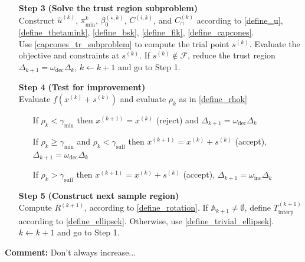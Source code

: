 \documentclass{article}
\newenvironment{comment}
  {\par\medskip
   \color{red}%
   \begin{framed}
   \textbf{Comment: }\ignorespaces}
 {\end{framed}
  \medskip}
\theoremstyle{case}
\numberwithin{theorem}{subsection}
\newcommand{\activeconstraintskpo}{{\mathbb A_{k+1}}}
\newcommand{\bsk}{{\beta_0^{(\star, k)}}}
\newcommand{\capcones}{{C^{(k)}_{\cap}}}
\newcommand{\dk}{\Delta_k}
\newcommand{\dkpo}{\Delta_{k+1}}
\newcommand{\feasible}{{\mathcal F}}
\newcommand{\gammabi}{\gamma_{\textrm{suff}}}
\newcommand{\gammasm}{\gamma_{\textrm{min}}}
\newcommand{\huk}{{{\hat u}^{(k)}}}
\newcommand{\mfk}{{{m}_f}^{(k)}}
\newcommand{\omegadec}{\omega_{\text{dec}}}
\newcommand{\omegainc}{\omega_{\text{inc}}}
\newcommand{\rk}{\rho_k}
\newcommand{\rotk}{{R^{(k+1)}}}
\newcommand{\sampletrkpo}{{T_{\text{interp}}^{(k+1)}}}
\newcommand{\sk}{{{s}^{(k)}}}
\newcommand{\thetamink}{{\pi^k_{\textrm{min}}}}
\newcommand{\xkpo}{{{x}^{(k+1)}}}
\newcommand{\xk}{x^{(k)}}
\newcommand{\zik}{{z^{(i, k)}}}
\newcommand{\fik}{{C^{(i, k)}}}
\begin{document}
\begin{algorithm}[H]
\begin{itemize}
        \item[\textbf{Step 3}] \textbf{(Solve the trust region subproblem)} \\
        	Construct $\huk$, $\thetamink$, $\bsk$, $\fik$, and $\capcones$ according to
        	\cref{define_u}, \cref{define_thetamink}, \cref{define_bsk}, \cref{define_fik}, \cref{define_capcones}. \\
        	Use \cref{capcones_tr_subproblem} to compute the trial point $\sk$.
        	Evaluate the objective and constraints at $\sk$.
        	If $\sk \not \in \feasible$, reduce the trust region $\Delta_{k+1} = \omegadec\dk$, $k \gets k+1$ and go to Step 1.
            
        \item[\textbf{Step 4}] \textbf{(Test for improvement)} \\
            Evaluate $f\left(\xk + \sk\right)$ and evaluate $\rk$ as in \cref{define_rhok} \begin{itemize}
                \item[] If $\rk < \gammasm$ then $\xkpo=\xk$ (reject) and $\Delta_{k+1} = \omegadec\dk$
                \item[] If $\rk \ge \gammasm$ and $\rk < \gammabi$ then $\xkpo=\xk+\sk$ (accept), $\Delta_{k+1} = \omegadec\dk$
                \item[] If $\rk > \gammabi$ then $\xkpo=\xk+\sk$ (accept), $\Delta_{k+1} = \omegainc\dk$
            \end{itemize}
            
        \item[\textbf{Step 5}] \textbf{(Construct next sample region)} \\
        	Compute $\rotk$, according to \cref{define_rotation}.
        	If $\activeconstraintskpo \ne \emptyset$, define $\sampletrkpo$ according to \cref{define_ellipsek}.
        	Otherwise, use \cref{define_trivial_ellipsek}. \\
            $k \gets k+1$ and go to Step 1.
    \end{itemize}
\end{algorithm}

\begin{comment}
Don't always increase...
\end{comment}
\end{document}
